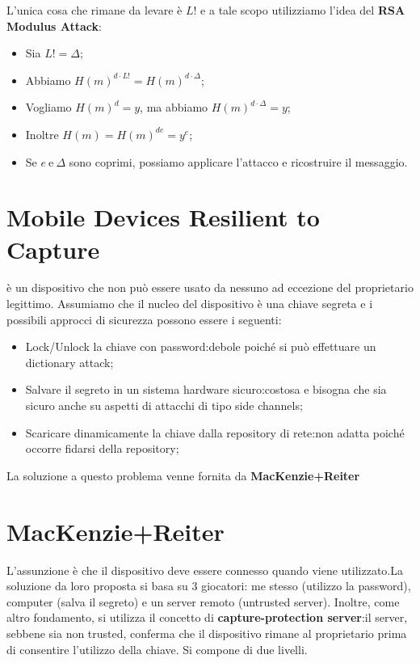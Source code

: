 \documentclass{book}
\begin{document}
L'unica cosa che rimane da levare è \(L! \) e a tale scopo utilizziamo l'idea del \textbf{RSA Modulus Attack}:\begin{itemize}
    \item Sia \(L! =\Delta \);
    \item Abbiamo \({H(m)}^{d\cdot L!}={H(m)}^{d\cdot \Delta}\);
    \item Vogliamo \({H(m)}^{d}=y\), ma abbiamo \({H(m)}^{d\cdot \Delta }=y\);
    \item Inoltre \(H(m)={H(m)}^{de}=y^{e}\);
    \item Se \(e\ \text{e}\ \Delta \) sono coprimi, possiamo applicare l'attacco e ricostruire il messaggio.
\end{itemize}
\section{Mobile Devices Resilient to Capture}
è un dispositivo che non può essere usato da nessuno ad eccezione del proprietario legittimo\@. Assumiamo che il nucleo del dispositivo è una chiave segreta e i possibili approcci di sicurezza possono essere i seguenti:\begin{itemize}
    \item Lock/Unlock la chiave con password:\@soluzione debole poiché si può effettuare un dictionary attack;
    \item Salvare il segreto in un sistema hardware sicuro:\@soluzione costosa e bisogna che sia sicuro anche su aspetti di attacchi di tipo side channels;
    \item Scaricare dinamicamente la chiave dalla repository di rete:\@soluzione non adatta poiché occorre fidarsi della repository;
\end{itemize}
La soluzione a questo problema venne fornita da \textbf{MacKenzie+Reiter}
\section{MacKenzie+Reiter}
L'assunzione è che il dispositivo deve essere connesso quando viene utilizzato\@.La soluzione da loro proposta si basa su 3 giocatori: me stesso (utilizzo la password), computer (salva il segreto) e un server remoto (untrusted server)\@. Inoltre, come altro fondamento, si utilizza il concetto di \textbf{capture-protection server}:il server, sebbene sia non trusted, conferma che il dispositivo rimane al proprietario prima di consentire l'utilizzo della chiave\@. Si compone di due livelli.
\end{document}
